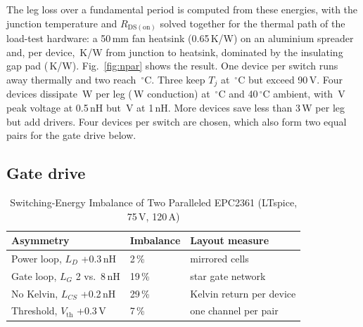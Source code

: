 \documentclass[conference]{IEEEtran}
\begin{document}
The leg loss over a fundamental period is computed from these energies, with the junction temperature and $R_\mathrm{DS(on)}$ solved together for the thermal path of the load-test hardware: a 50\,mm fan heatsink (0.65\,K/W) on an aluminium spreader and, per device, \Rjh\,K/W from junction to heatsink, dominated by the insulating gap pad (\Rpad\,K/W). Fig.~\ref{fig:npar} shows the result. One device per switch runs away thermally and two reach \TjTwo\,$^\circ$C. Three keep $T_j$ at \TjThree\,$^\circ$C but exceed 90\,V. Four devices dissipate \TotFourA\,W per leg (\CondFour\,W conduction) at \TjFour\,$^\circ$C and 40\,$^\circ$C ambient, with \VpkFourA\,V peak voltage at 0.5\,nH but \VpkFourB\,V at 1\,nH. More devices save less than 3\,W per leg but add drivers. Four devices per switch are chosen, which also form two equal pairs for the gate drive below.

\subsection{Gate drive}
\begin{table}[t]
\centering
\caption{Switching-Energy Imbalance of Two Paralleled EPC2361 (LTspice, 75\,V, 120\,A)}
\label{tab:sharing}
\setlength{\tabcolsep}{3pt}
\begin{tabular}{@{}lll@{}}
\toprule
Asymmetry & Imbalance & Layout measure \\
\midrule
Power loop, $L_D$ +0.3\,nH & 2\,\% & mirrored cells \\
Gate loop, $L_G$ 2 vs.\ 8\,nH & 19\,\% & star gate network \\
No Kelvin, $L_{CS}$ +0.2\,nH & 29\,\% & Kelvin return per device \\
Threshold, $V_\mathrm{th}$ +0.3\,V & 7\,\% & one channel per pair \\
\bottomrule
\end{tabular}
\end{table}
\end{document}
